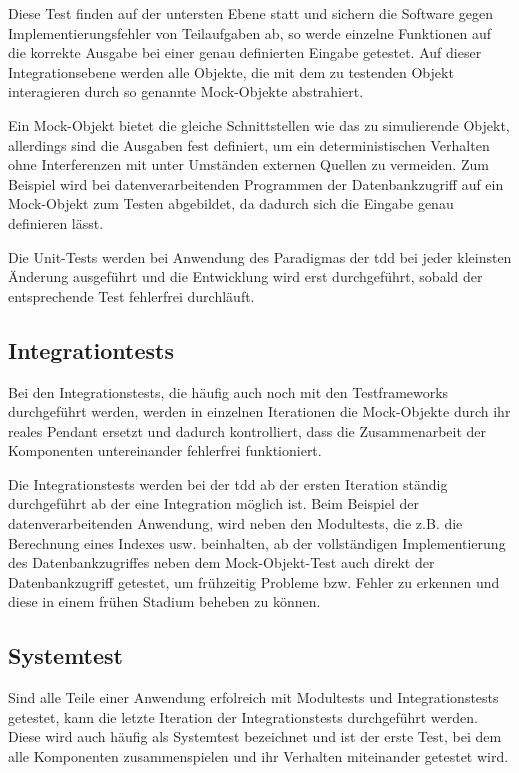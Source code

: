 \documentclass[a4paper,10pt]{scrartcl}
\begin{document}
Diese Test finden auf der untersten Ebene statt und sichern die Software gegen
Implementierungsfehler von Teilaufgaben ab, so werde einzelne Funktionen auf
die korrekte Ausgabe bei einer genau definierten Eingabe getestet. Auf dieser
Integrationsebene werden alle Objekte, die mit dem zu testenden Objekt
interagieren durch so genannte Mock-Objekte abstrahiert.

Ein Mock-Objekt bietet die gleiche Schnittstellen wie das zu simulierende
Objekt, allerdings sind die Ausgaben fest definiert, um ein deterministischen
Verhalten ohne Interferenzen mit unter Umständen externen Quellen zu vermeiden.
Zum Beispiel wird bei datenverarbeitenden Programmen der Datenbankzugriff auf
ein Mock-Objekt zum Testen abgebildet, da dadurch sich die Eingabe genau
definieren lässt.

Die Unit-Tests werden bei Anwendung des Paradigmas der \gls{tdd} bei jeder
kleinsten Änderung ausgeführt und die Entwicklung wird erst durchgeführt,
sobald der entsprechende Test fehlerfrei durchläuft.

\subsection{Integrationtests}
Bei den Integrationstests, die häufig auch noch mit den Testframeworks
durchgeführt werden, werden in einzelnen Iterationen die Mock-Objekte durch ihr
reales Pendant ersetzt und dadurch kontrolliert, dass die Zusammenarbeit der
Komponenten untereinander fehlerfrei funktioniert.

Die Integrationstests werden bei der \gls{tdd} ab der ersten Iteration ständig
durchgeführt ab der eine Integration möglich ist. Beim Beispiel der
datenverarbeitenden Anwendung, wird neben den Modultests, die z.B. die
Berechnung eines Indexes usw. beinhalten, ab der vollständigen Implementierung
des Datenbankzugriffes neben dem Mock-Objekt-Test auch direkt der
Datenbankzugriff getestet, um frühzeitig Probleme bzw. Fehler zu erkennen und
diese in einem frühen Stadium beheben zu können.

\subsection{Systemtest}
Sind alle Teile einer Anwendung erfolreich mit Modultests und Integrationstests
getestet, kann die letzte Iteration der Integrationstests durchgeführt werden.
Diese wird auch häufig als Systemtest bezeichnet und ist der erste Test, bei
dem alle Komponenten zusammenspielen und ihr Verhalten miteinander getestet
wird.
\end{document}

